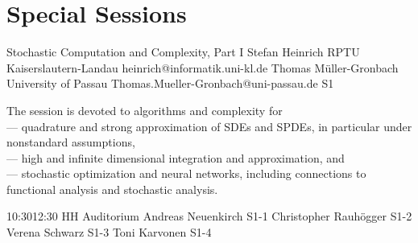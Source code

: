 \documentclass[12pt,lettersize,oneside]{book} %
\begin{document}

\chapter{Special Sessions}

\begin{session}
 {Stochastic Computation and Complexity, Part I}%
 {Stefan Heinrich}%
 {RPTU Kaiserslautern-Landau}%
 {heinrich@informatik.uni-kl.de}%
 {Thomas M\"uller-Gronbach}%
 {University of Passau}%
 {Thomas.Mueller-Gronbach@uni-passau.de}%
 {S1}%
 {}%

 The session is devoted to algorithms and complexity for\\
 --- quadrature and strong approximation of SDEs and SPDEs, in particular under nonstandard assumptions,\\
 --- high and infinite dimensional integration and approximation, and\\
 --- stochastic optimization and neural networks,
 including connections to functional analysis and stochastic analysis.
\end{session}



\sessionPart{}%
{\hfill{}
{10:30}{12:30} %
{HH Auditorium}} %
{Andreas Neuenkirch}
{S1-1}
{Christopher Rauhögger}
{S1-2}
{Verena Schwarz}
{S1-3}
{Toni Karvonen}
{S1-4}
\end{document}

